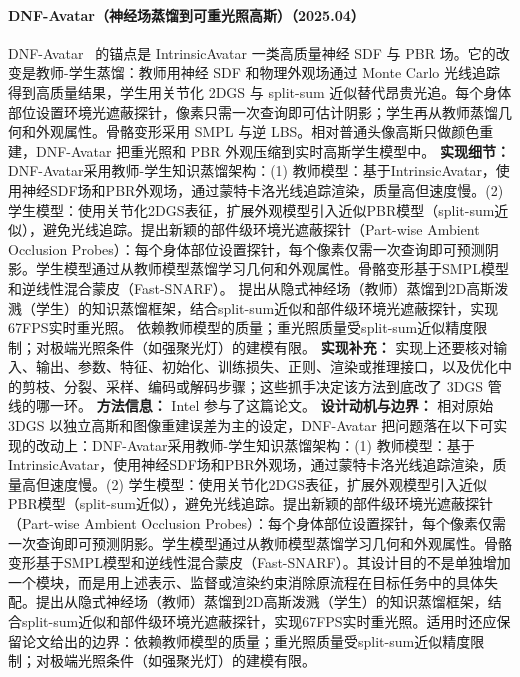 \paragraph{DNF-Avatar（神经场蒸馏到可重光照高斯）（2025.04）}
DNF-Avatar~\cite{2504_10486} 的锚点是 IntrinsicAvatar 一类高质量神经 SDF 与 PBR 场。它的改变是教师-学生蒸馏：教师用神经 SDF 和物理外观场通过 Monte Carlo 光线追踪得到高质量结果，学生用关节化 2DGS 与 split-sum 近似替代昂贵光追。每个身体部位设置环境光遮蔽探针，像素只需一次查询即可估计阴影；学生再从教师蒸馏几何和外观属性。骨骼变形采用 SMPL 与逆 LBS。相对普通头像高斯只做颜色重建，DNF-Avatar 把重光照和 PBR 外观压缩到实时高斯学生模型中。
\textbf{实现细节：} DNF-Avatar采用教师-学生知识蒸馏架构：(1) 教师模型：基于IntrinsicAvatar，使用神经SDF场和PBR外观场，通过蒙特卡洛光线追踪渲染，质量高但速度慢。(2) 学生模型：使用关节化2DGS表征，扩展外观模型引入近似PBR模型（split-sum近似），避免光线追踪。提出新颖的部件级环境光遮蔽探针（Part-wise Ambient Occlusion Probes）：每个身体部位设置探针，每个像素仅需一次查询即可预测阴影。学生模型通过从教师模型蒸馏学习几何和外观属性。骨骼变形基于SMPL模型和逆线性混合蒙皮（Fast-SNARF）。 提出从隐式神经场（教师）蒸馏到2D高斯泼溅（学生）的知识蒸馏框架，结合split-sum近似和部件级环境光遮蔽探针，实现67FPS实时重光照。 依赖教师模型的质量；重光照质量受split-sum近似精度限制；对极端光照条件（如强聚光灯）的建模有限。
\textbf{实现补充：} 实现上还要核对输入、输出、参数、特征、初始化、训练损失、正则、渲染或推理接口，以及优化中的剪枝、分裂、采样、编码或解码步骤；这些抓手决定该方法到底改了 3DGS 管线的哪一环。
\textbf{方法信息：} Intel 参与了这篇论文。
\textbf{设计动机与边界：} 相对原始 3DGS 以独立高斯和图像重建误差为主的设定，DNF-Avatar 把问题落在以下可实现的改动上：DNF-Avatar采用教师-学生知识蒸馏架构：(1) 教师模型：基于IntrinsicAvatar，使用神经SDF场和PBR外观场，通过蒙特卡洛光线追踪渲染，质量高但速度慢。(2) 学生模型：使用关节化2DGS表征，扩展外观模型引入近似PBR模型（split-sum近似），避免光线追踪。提出新颖的部件级环境光遮蔽探针（Part-wise Ambient Occlusion Probes）：每个身体部位设置探针，每个像素仅需一次查询即可预测阴影。学生模型通过从教师模型蒸馏学习几何和外观属性。骨骼变形基于SMPL模型和逆线性混合蒙皮（Fast-SNARF）。其设计目的不是单独增加一个模块，而是用上述表示、监督或渲染约束消除原流程在目标任务中的具体失配。提出从隐式神经场（教师）蒸馏到2D高斯泼溅（学生）的知识蒸馏框架，结合split-sum近似和部件级环境光遮蔽探针，实现67FPS实时重光照。适用时还应保留论文给出的边界：依赖教师模型的质量；重光照质量受split-sum近似精度限制；对极端光照条件（如强聚光灯）的建模有限。
